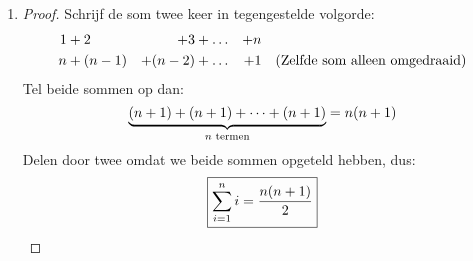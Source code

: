 \documentclass{article}
\begin{document}
\begin{enumerate}[label=\alph*)]
    \item
          \begin{proof}
              Schrijf de som twee keer in tegengestelde volgorde:
              \begin{align*}
                  1 & + 2     & + 3     & + \dots & + n &                                           \\
                  n & + (n-1) & + (n-2) & + \dots & + 1 & \quad (\text{Zelfde som alleen omgedraaid})
              \end{align*}
              Tel beide sommen op dan:
              \[\underbrace{(n+1) + (n+1) + \dots + (n+1)}_{n \text{ termen}} = n(n+1)\]
              Delen door twee omdat we beide sommen opgeteld hebben, dus:
              \[\boxed{\sum_{i=1}^{n} i = \frac{n(n+1)}{2}}\]
          \end{proof}
\end{enumerate}
\end{document}
